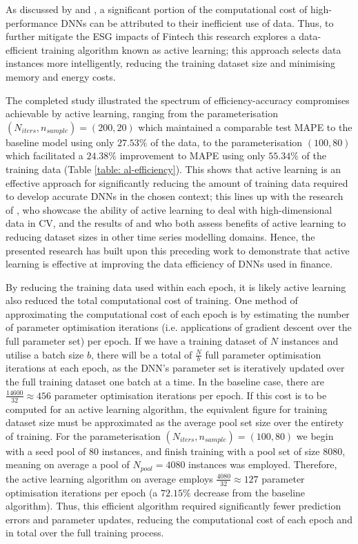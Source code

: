\documentclass[a4paper, 11pt]{report}
\begin{document}
    As discussed by \citet{bender-2021} and \citet{walsh-2021}, a significant portion of the computational cost of high-performance DNNs can be attributed to their inefficient use of data. Thus, to further mitigate the ESG impacts of Fintech this research explores a data-efficient training algorithm known as active learning; this approach selects data instances more intelligently, reducing the training dataset size and minimising memory and energy costs.

    The completed study illustrated the spectrum of efficiency-accuracy compromises achievable by active learning, ranging from the parameterisation $(N_{iters}, n_{sample}) = (200, 20)$ which maintained a comparable test MAPE to the baseline model using only $27.53\%$ of the data, to the parameterisation $(100, 80)$ which facilitated a $24.38\%$ improvement to MAPE using only $55.34\%$ of the training data (Table \ref{table: al-efficiency}). This shows that active learning is an effective approach for significantly reducing the amount of training data required to develop accurate DNNs in the chosen context; this lines up with the research of \citet{ren-2021}, who showcase the ability of active learning to deal with high-dimensional data in CV, and the results of \citet{peng-2017} and \citet{zimmer-2018} who both assess benefits of active learning to reducing dataset sizes in other time series modelling domains. Hence, the presented research has built upon this preceding work to demonstrate that active learning is effective at improving the data efficiency of DNNs used in finance.

    By reducing the training data used within each epoch, it is likely active learning also reduced the total computational cost of training. One method of approximating the computational cost of each epoch is by estimating the number of parameter optimisation iterations (i.e. applications of gradient descent over the full parameter set) per epoch. If we have a training dataset of $N$ instances and utilise a batch size $b$, there will be a total of $\frac{N}{b}$ full parameter optimisation iterations at each epoch, as the DNN's parameter set is iteratively updated over the full training dataset one batch at a time. In the baseline case, there are $\frac{14600}{32} \approx 456$ parameter optimisation iterations per epoch. If this cost is to be computed for an active learning algorithm, the equivalent figure for training dataset size must be approximated as the average pool set size over the entirety of training. For the parameterisation $(N_{iters}, n_{sample}) = (100, 80)$ we begin with a seed pool of $80$ instances, and finish training with a pool set of size $8080$, meaning on average a pool of $N_{pool} = 4080$ instances was employed. Therefore, the active learning algorithm on average employs $\frac{4080}{32} \approx 127$ parameter optimisation iterations per epoch (a $72.15\%$ decrease from the baseline algorithm). Thus, this efficient algorithm required significantly fewer prediction errors and parameter updates, reducing the computational cost of each epoch and in total over the full training process.
\end{document}
